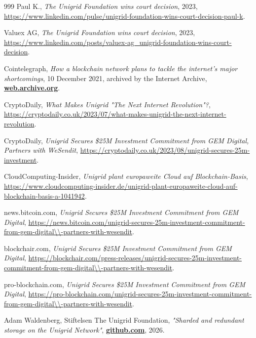 \documentclass[a4paper,oneside]{article}
\let\oldhref\href
\renewcommand{\href}[2]{\oldhref{#1}{\bfseries#2}}
\begin{document}
\begin{thebibliography}{999}
	Paul K.,
	\emph{The Unigrid Foundation wins court decision},
	2023,
	\url{https://www.linkedin.com/pulse/unigrid-foundation-wins-court-decision-paul-k}.

	Valuex AG,
	\emph{The Unigrid Foundation wins court decision},
	2023,
	\url{https://www.linkedin.com/posts/valuex-ag_unigrid-foundation-wins-court-decision}.


	Cointelegraph,
	\emph{How a blockchain network plans to tackle the internet's major shortcomings},
	10 December 2021, archived by the Internet Archive,
	\href{https://web.archive.org/web/20211210102013/https://cointelegraph.com/news/how-a-blockchain-network-plans-to-tackle-the-internets-major-shortcomings}{web.archive.org}.

	CryptoDaily,
	\emph{What Makes Unigrid "The Next Internet Revolution"?},
	\url{https://cryptodaily.co.uk/2023/07/what-makes-unigrid-the-next-internet-revolution}.

	CryptoDaily,
	\emph{Unigrid Secures \$25M Investment Commitment from GEM Digital, Partners with WeSendit},
	\url{https://cryptodaily.co.uk/2023/08/unigrid-secures-25m-investment}.

	CloudComputing-Insider,
	\emph{Unigrid plant europaweite Cloud auf Blockchain-Basis},
	\url{https://www.cloudcomputing-insider.de/unigrid-plant-europaweite-cloud-auf-blockchain-basis-a-1041942}.

	news.bitcoin.com,
	\emph{Unigrid Secures \$25M Investment Commitment from GEM Digital},
	\url{https://news.bitcoin.com/unigrid-secures-25m-investment-commitment-from-gem-digital\\-partners-with-wesendit}.

	blockchair.com,
	\emph{Unigrid Secures \$25M Investment Commitment from GEM Digital},
	\url{https://blockchair.com/press-releases/unigrid-secures-25m-investment-commitment-from-gem-digital\\-partners-with-wesendit}.

	pro-blockchain.com,
	\emph{Unigrid Secures \$25M Investment Commitment from GEM Digital},
	\url{https://pro-blockchain.com/unigrid-secures-25m-investment-commitment-from-gem-digital\\-partners-with-wesendit}.

	Adam Waldenberg, Stiftelsen The Unigrid Foundation,
	\emph{"Sharded and redundant storage on the Unigrid Network"},
	\href{https://github.com/unigrid-project/hedgehog/tree/master/documentation/storage-white-paper}{github.com},
	2026.


\end{thebibliography}
\end{document}
